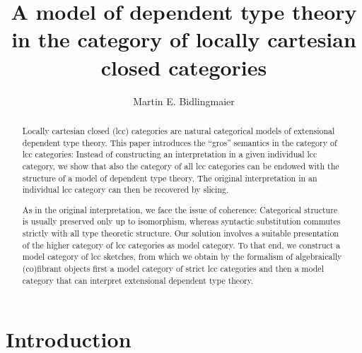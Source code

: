 \documentclass[a4paper]{article}
\theoremstyle{remark}
\theoremstyle{definition}
\begin{document}
\title{A model of dependent type theory in the category of locally cartesian closed categories}

\author{Martin E. Bidlingmaier}

\maketitle

\begin{abstract}
  Locally cartesian closed (lcc) categories are natural categorical models of extensional dependent type theory.
  This paper introduces the ``gros'' semantics in the category of lcc categories:
  Instead of constructing an interpretation in a given individual lcc category, we show that also the category of all lcc categories can be endowed with the structure of a model of dependent type theory.
  The original interpretation in an individual lcc category can then be recovered by slicing.

  As in the original interpretation, we face the issue of coherence:
  Categorical structure is usually preserved only up to isomorphism, whereas syntactic substitution commutes strictly with all type theoretic structure.
  Our solution involves a suitable presentation of the higher category of lcc categories as model category.
  To that end, we construct a model category of lcc sketches, from which we obtain by the formalism of algebraically (co)fibrant objects first a model category of strict lcc categories and then a model category that can interpret extensional dependent type theory.
\end{abstract}

\section{Introduction}
\end{document}
